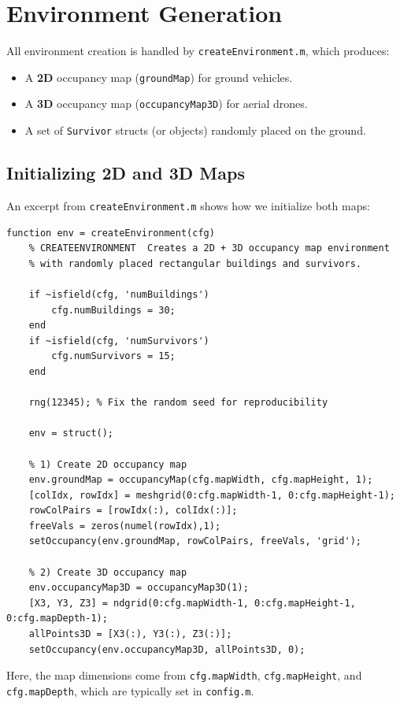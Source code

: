 \documentclass[12pt,a4paper]{report}
\begin{document}
\section{Environment Generation}
\label{sec:env_generation}

All environment creation is handled by \texttt{createEnvironment.m}, which produces:
\begin{itemize}
    \item A \textbf{2D} occupancy map (\texttt{groundMap}) for ground vehicles.
    \item A \textbf{3D} occupancy map (\texttt{occupancyMap3D}) for aerial drones.
    \item A set of \texttt{Survivor} structs (or objects) randomly placed on the ground.
\end{itemize}

\subsection*{Initializing 2D and 3D Maps}
An excerpt from \texttt{createEnvironment.m} shows how we initialize both maps:
\begin{verbatim}
function env = createEnvironment(cfg)
    % CREATEENVIRONMENT  Creates a 2D + 3D occupancy map environment
    % with randomly placed rectangular buildings and survivors.

    if ~isfield(cfg, 'numBuildings')
        cfg.numBuildings = 30;
    end
    if ~isfield(cfg, 'numSurvivors')
        cfg.numSurvivors = 15;
    end

    rng(12345); % Fix the random seed for reproducibility

    env = struct();

    % 1) Create 2D occupancy map
    env.groundMap = occupancyMap(cfg.mapWidth, cfg.mapHeight, 1);
    [colIdx, rowIdx] = meshgrid(0:cfg.mapWidth-1, 0:cfg.mapHeight-1);
    rowColPairs = [rowIdx(:), colIdx(:)];
    freeVals = zeros(numel(rowIdx),1);
    setOccupancy(env.groundMap, rowColPairs, freeVals, 'grid');

    % 2) Create 3D occupancy map
    env.occupancyMap3D = occupancyMap3D(1);
    [X3, Y3, Z3] = ndgrid(0:cfg.mapWidth-1, 0:cfg.mapHeight-1, 0:cfg.mapDepth-1);
    allPoints3D = [X3(:), Y3(:), Z3(:)];
    setOccupancy(env.occupancyMap3D, allPoints3D, 0);
\end{verbatim}
Here, the map dimensions come from \texttt{cfg.mapWidth}, \texttt{cfg.mapHeight}, 
and \texttt{cfg.mapDepth}, which are typically set in \texttt{config.m}.
\end{document}
